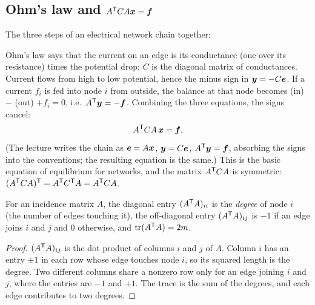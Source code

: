 \subsection{\texorpdfstring{Ohm's law and \(A^{\mathsf{T}} CA\boldsymbol{x}=\boldsymbol{f}\)}{Ohm's law and ATCAx = f}}

The three steps of an electrical network chain together:
\begin{center}
\end{center}
Ohm's law says that the current on an edge is its conductance (one over its resistance) times the
potential drop; $C$ is the diagonal matrix of conductances. Current flows from high to low
potential, hence the minus sign in $\boldsymbol{y}=-C\boldsymbol{e}$. If a current $f_i$ is fed into node $i$ from
outside, the balance at that node becomes (in) $-$ (out) $+f_i=0$, i.e.\ $A^{\mathsf{T}}\boldsymbol{y}=-\boldsymbol{f}$.
Combining the three equations, the signs cancel:
\[
A^{\mathsf{T}} CA\,\boldsymbol{x}=\boldsymbol{f}.
\]
(The lecture writes the chain as $\boldsymbol{e}=A\boldsymbol{x}$, $\boldsymbol{y}=C\boldsymbol{e}$, $A^{\mathsf{T}}\boldsymbol{y}=\boldsymbol{f}$, absorbing
the signs into the conventions; the resulting equation is the same.) This is the basic equation of
equilibrium for networks, and the matrix $A^{\mathsf{T}} CA$ is symmetric:
$(A^{\mathsf{T}} CA)^{\mathsf{T}}=A^{\mathsf{T}} C^{\mathsf{T}} A=A^{\mathsf{T}} CA$.

\begin{proposition}\label{prop:u13-laplacian}
For an incidence matrix $A$, the diagonal entry $(A^{\mathsf{T}} A)_{ii}$ is the \emph{degree} of node $i$
(the number of edges touching it), the off-diagonal entry $(A^{\mathsf{T}} A)_{ij}$ is $-1$ if an edge joins
$i$ and $j$ and $0$ otherwise, and $\operatorname{tr}(A^{\mathsf{T}} A)=2m$.
\end{proposition}
\begin{proof}
$(A^{\mathsf{T}} A)_{ij}$ is the dot product of columns $i$ and $j$ of $A$. Column $i$ has an entry $\pm1$ in
each row whose edge touches node $i$, so its squared length is the degree. Two different columns
share a nonzero row only for an edge joining $i$ and $j$, where the entries are $-1$ and $+1$. The
trace is the sum of the degrees, and each edge contributes to two degrees.
\end{proof}

